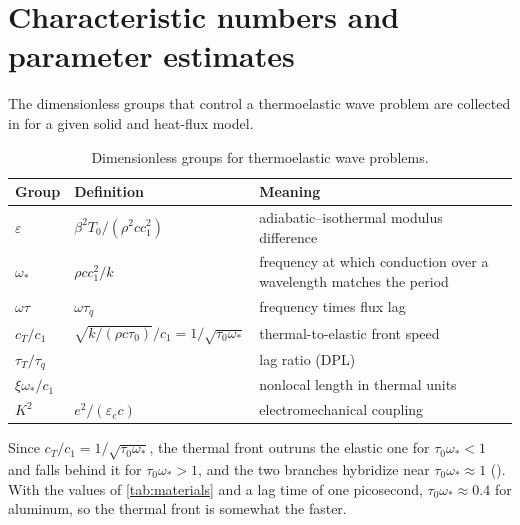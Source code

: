 \section{Characteristic numbers and parameter estimates}\label{app:numbers}
The dimensionless groups that control a thermoelastic wave problem are collected in  for a given solid and heat-flux model.
\begin{table}[ht]\centering\small
\caption{Dimensionless groups for thermoelastic wave problems.}\label{tab:groups}
\begin{tabular}{@{}llp{6.2cm}@{}}\toprule
Group & Definition & Meaning\\\midrule
$\varepsilon$ & $\beta^2T_0/(\rho^2cc_1^2)$ & adiabatic--isothermal modulus difference\\
$\omega_*$ & $\rho cc_1^2/k$ & frequency at which conduction over a wavelength matches the period\\
$\omega\tau$ & $\omega\tau_q$ & frequency times flux lag\\
$c_T/c_1$ & $\sqrt{k/(\rho c\tau_0)}/c_1=1/\sqrt{\tau_0\omega_*}$ & thermal-to-elastic front speed\\
$\tau_T/\tau_q$ & & lag ratio (DPL)\\
$\xi\omega_*/c_1$ & & nonlocal length in thermal units\\
$K^2$ & $e^2/(\varepsilon_ec)$ & electromechanical coupling\\
\bottomrule\end{tabular}
\end{table}
Since $c_T/c_1=1/\sqrt{\tau_0\omega_*}$, the thermal front outruns the elastic one for $\tau_0\omega_*<1$ and falls behind it for $\tau_0\omega_*>1$, and the two branches hybridize near $\tau_0\omega_*\approx1$ (). With the values of \cref{tab:materials} and a lag time of one picosecond, $\tau_0\omega_*\approx0.4$ for aluminum, so the thermal front is somewhat the faster.
